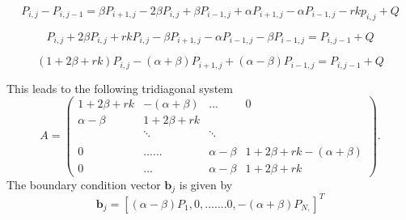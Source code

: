 \documentclass[12pt]{article}
\numberwithin{equation}{section} %
\begin{document}
 \begin{equation*}
P_{i,j}-P_{i,j-1}=\beta P_{i+1,j}-2\beta P_{i,j}+\beta
P_{i-1,j}+\alpha P_{i+1,j}-\alpha P_{i-1,j}-rkp_{i,j} +Q
 \end{equation*}

  \begin{equation*}
P_{i,j}+2\beta P_{i,j}+rkP_{i,j}-\beta P_{i+1,j}-\alpha
P_{i-1,j}-\beta P_{i-1,j}=P_{i,j-1}+Q
 \end{equation*}

 \begin{equation*}
(1+2\beta
+rk)P_{i,j}-(\alpha+\beta)P_{i+1,j}+(\alpha-\beta)P_{i-1,j}=P_{i,j-1}+Q
 \end{equation*}

This leads to the following tridiagonal system
\[A = \left( \begin{array}{cccc}
1+2\beta +rk& -(\alpha+\beta) & ...& 0\\
\alpha-\beta & 1+2\beta +rk &  & \\
& \ddots & \ddots &  \\
& & &  \\
 0&......& \alpha-\beta&1+2\beta+rk  -(\alpha+\beta) \\
 0 &...&\alpha-\beta & 1+2\beta
+rk \end{array} \right) .\] The boundary condition vector
$\textbf{b}_j$ is given by
\begin{equation*}
\textbf{b}_j=  \left[
(\alpha-\beta)P_{1},0,.......0,-(\alpha+\beta)P_{N,}\right]^{T}
 \end{equation*}
\end{document}
